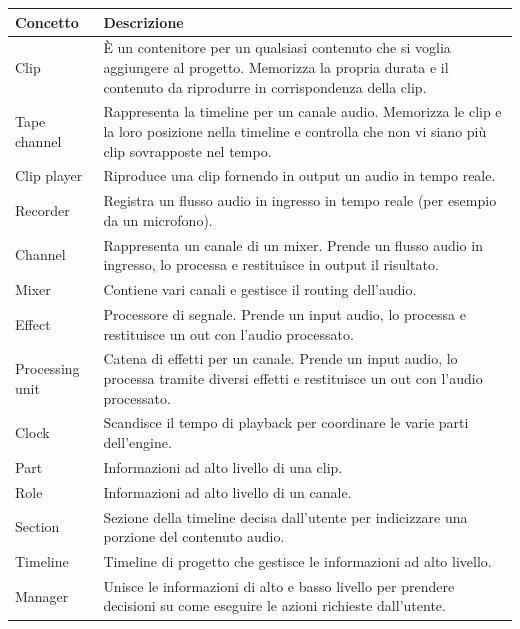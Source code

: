 \documentclass[a4paper,12pt]{report}
\begin{document}
\begin{center}
\begin{longtable}{| m{7em} | m{7cm} |} 
 \hline
 \textbf{Concetto} & \textbf{Descrizione} \\ [0.5ex] 
 \hline
 Clip & È un contenitore per un qualsiasi contenuto che si voglia aggiungere al progetto. Memorizza la propria durata e il contenuto da riprodurre in corrispondenza della clip. \\ 
 \hline
 Tape channel & Rappresenta la timeline per un canale audio. Memorizza le clip e la loro posizione nella timeline e controlla che non vi siano più clip sovrapposte nel tempo. \\
 \hline
 Clip player & Riproduce una clip fornendo in output un audio in tempo reale. \\
 \hline
 Recorder & Registra un flusso audio in ingresso in tempo reale (per esempio da un microfono). \\
 \hline
 Channel & Rappresenta un canale di un mixer.
Prende un flusso audio in ingresso, lo processa e restituisce in output il risultato. \\ 
 \hline
 Mixer & Contiene vari canali e gestisce il routing dell’audio. \\
 \hline 
 Effect & Processore di segnale. Prende un input audio, lo processa e restituisce un out con l’audio processato. \\
 \hline
 Processing unit & Catena di effetti per un canale. Prende un input audio, lo processa tramite diversi effetti e restituisce un out con l’audio processato. \\
 \hline
 Clock & Scandisce il tempo di playback per coordinare le varie parti dell’engine. \\
 \hline
 Part & Informazioni ad alto livello di una clip. \\
 \hline
 Role & Informazioni ad alto livello di un canale. \\
\hline
Section & Sezione della timeline decisa dall’utente per indicizzare una porzione del contenuto audio. \\
\hline
Timeline & Timeline di progetto che gestisce le informazioni ad alto livello. \\
\hline
Manager & Unisce le informazioni di alto e basso livello per prendere decisioni su come eseguire le azioni richieste dall’utente. \\
\hline
\end{longtable}
\end{center}
\end{document}

